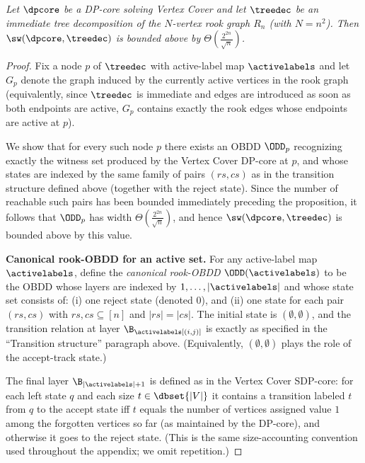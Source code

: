 

\par\medskip
{}
{\it
Let $\dpcore$ be a DP-core solving {\sc Vertex Cover} and let $\treedec$ be an
immediate tree decomposition of the $N$-vertex rook graph $R_n$ (with $N=n^2$).
Then $\sw(\dpcore,\treedec)$ is bounded above by
$\Theta\!\left(\frac{2^{2n}}{\sqrt{n}}\right)$.
}

\begin{proof}
Fix a node $p$ of $\treedec$ with active-label map $\activelabels$ and let
$G_p$ denote the graph induced by the currently active vertices in the rook
graph (equivalently, since $\treedec$ is immediate and edges are introduced as
soon as both endpoints are active, $G_p$ contains exactly the rook edges whose
endpoints are active at $p$).

We show that for every such node $p$ there exists an OBDD $\ODD_p$ recognizing
exactly the witness set produced by the {\sc Vertex Cover} DP-core at $p$, and
whose states are indexed by the same family of pairs $(rs,cs)$ as in the
transition structure defined above (together with the reject state). Since the
number of reachable such pairs has been bounded immediately preceding the
proposition, it follows that $\ODD_p$ has width
$\Theta\!\left(\frac{2^{2n}}{\sqrt{n}}\right)$, and hence
$\sw(\dpcore,\treedec)$ is bounded above by this value.

\smallskip
\noindent\textbf{Canonical rook-OBDD for an active set.}
For any active-label map $\activelabels$, define the \emph{canonical rook-OBDD}
$\ODD(\activelabels)$ to be the OBDD whose layers are indexed by
$1,\dots,|\activelabels|$ and whose state set consists of:
(i) one reject state (denoted $0$), and (ii) one state for each pair
$(rs,cs)$ with $rs,cs \subseteq [n]$ and $|rs|=|cs|$.
The initial state is $(\emptyset,\emptyset)$, and the transition relation at
layer $\B_{\activelabels[(i,j)]}$ is exactly as specified in the ``Transition
structure'' paragraph above. (Equivalently, $(\emptyset,\emptyset)$ plays the
role of the accept-track state.)

The final layer $\B_{|\activelabels|+1}$ is defined as in the {\sc Vertex Cover}
SDP-core: for each left state $q$ and each size $t \in \dbset{|V|}$ it contains a
transition labeled $t$ from $q$ to the accept state iff $t$ equals the number of
vertices assigned value $1$ among the forgotten vertices so far (as maintained
by the DP-core), and otherwise it goes to the reject state. (This is the same
size-accounting convention used throughout the appendix; we omit repetition.)


\end{proof}
